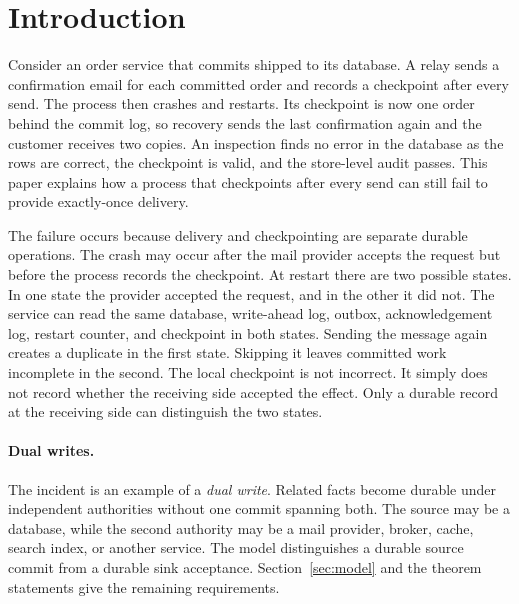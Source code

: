 \documentclass[sigplan,10pt]{acmart}
\theoremstyle{plain}
\theoremstyle{definition}
\begin{document}
\maketitle

\section{Introduction}\label{sec:intro}

Consider an order service that commits \textsf{shipped} to its
database. A relay sends a confirmation email for each committed order
and records a checkpoint after every send. The process then crashes and
restarts. Its checkpoint is now one order behind the commit log, so
recovery sends the last confirmation again and the customer receives
two copies. An inspection finds no error in the database as the rows are
correct, the checkpoint is valid, and the store-level audit
passes. This paper explains how a process that checkpoints after every
send can still fail to provide exactly-once delivery.

The failure occurs because delivery and checkpointing are separate
durable operations. The crash may occur after the mail provider
accepts the request but before the process records the checkpoint. At
restart there are two possible states. In one state the provider
accepted the request, and in the other it did not. The service can read
the same database, write-ahead log, outbox, acknowledgement log, restart counter, 
and checkpoint in both states. Sending the message again
creates a duplicate in the first state. Skipping it leaves committed
work incomplete in the second. The local checkpoint is not incorrect.
It simply does not record whether the receiving side accepted the
effect. Only a durable record at the receiving side can distinguish
the two states.

\paragraph{Dual writes.}
The incident is an example of a \emph{dual write}. Related facts
become durable under independent authorities without one commit
spanning both. The source may be a database, while the second
authority may be a mail provider, broker, cache, search index, or
another service. The model distinguishes a durable source commit from
a durable sink acceptance. Section~\ref{sec:model} and the
theorem statements give the remaining requirements.
\end{document}
